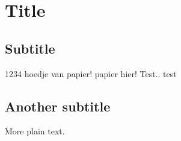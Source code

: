 \documentclass{article}
\begin{document}
\section{Title}

\subsection{Subtitle}

1234 hoedje van papier!
papier hier!
Test.. test
\subsection{Another subtitle}

More plain text.
\end{document}
